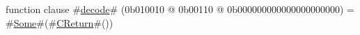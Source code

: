 function clause #\hyperref[sailMIPSzdecode]{decode}# (0b010010 @ 0b00110 @ 0b000000000000000000000) = #\hyperref[sailMIPSzSome]{Some}#(#\hyperref[sailMIPSzCReturn]{CReturn}#())
